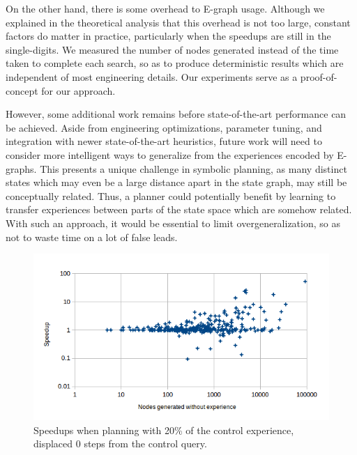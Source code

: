 \documentclass[letterpaper]{article}
\begin{document}
On the other hand, there is some overhead to E-graph usage.
Although we explained in the theoretical analysis that this overhead is not too large, constant factors do matter in practice, particularly when the speedups are still in the single-digits.
We measured the number of nodes generated instead of the time taken to complete each search, so as to produce deterministic results which are independent of most engineering details.
Our experiments serve as a proof-of-concept for our approach.

However, some additional work remains before state-of-the-art performance can be achieved.
Aside from engineering optimizations, parameter tuning, and integration with newer state-of-the-art heuristics, future work will need to consider more intelligent ways to generalize from the experiences encoded by E-graphs.
This presents a unique challenge in symbolic planning, as many distinct states which may even be a large distance apart in the state graph, may still be conceptually related.
Thus, a planner could potentially benefit by learning to transfer experiences between parts of the state space which are somehow related.
With such an approach, it would be essential to limit overgeneralization, so as not to waste time on a lot of false leads.

\begin{figure}
	\centering
	\includegraphics[scale=0.5]{Speedup_20_0.png}
	\caption{Speedups when planning with 20\% of the control experience, displaced 0 steps from the control query.}
	 \label{fig:s_20_0}
\end{figure}
\end{document}

